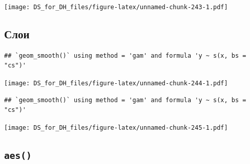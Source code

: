 \documentclass[
]{book}
\newenvironment{Shaded}{\begin{snugshade}}{\end{snugshade}}
\newcommand{\DataTypeTok}[1]{\textcolor[rgb]{0.13,0.29,0.53}{#1}}
\newcommand{\KeywordTok}[1]{\textcolor[rgb]{0.13,0.29,0.53}{\textbf{#1}}}
\newcommand{\NormalTok}[1]{#1}
\newcommand{\OperatorTok}[1]{\textcolor[rgb]{0.81,0.36,0.00}{\textbf{#1}}}
\newcommand{\StringTok}[1]{\textcolor[rgb]{0.31,0.60,0.02}{#1}}
\begin{document}
\texttt{[image: DS\_for\_DH\_files/figure-latex/unnamed-chunk-243-1.pdf]}

\hypertarget{ux441ux43bux43eux438}{%
\subsection{Слои}\label{ux441ux43bux43eux438}}

\begin{Shaded}
\end{Shaded}

\begin{verbatim}
## `geom_smooth()` using method = 'gam' and formula 'y ~ s(x, bs = "cs")'
\end{verbatim}

\texttt{[image: DS\_for\_DH\_files/figure-latex/unnamed-chunk-244-1.pdf]}

\begin{Shaded}
\end{Shaded}

\begin{verbatim}
## `geom_smooth()` using method = 'gam' and formula 'y ~ s(x, bs = "cs")'
\end{verbatim}

\texttt{[image: DS\_for\_DH\_files/figure-latex/unnamed-chunk-245-1.pdf]}

\hypertarget{aes}{%
\subsection{\texorpdfstring{\texttt{aes()}}{aes()}}\label{aes}}

\begin{Shaded}
\end{Shaded}
\end{document}
